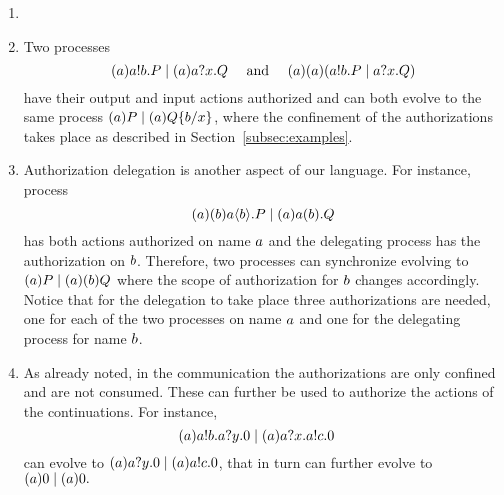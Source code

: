 \begin{example}
\label{ex:op_semantics1}
\begin{enumerate}\item[]{}
\item
Two processes
 \[
   {(a)a!b.P \;|\; (a)a?x.Q \quad  \text{ and } 
   \quad (a)(a)(a!b.P \;|\; a?x.Q)}
 \]
have their output and input actions authorized and can both evolve to  the same process $(a)P \;|\; (a)Q\{b/x\}$, where the confinement of the authorizations takes place as described in Section~\ref{subsec:examples}. 
\item
Authorization delegation is another aspect of our language. For instance, process
\[
   { (a)(b)a\langle b\rangle.P \;|\; (a)a(b).Q}
\] 
has both actions authorized on name $a$ and the delegating process has the %
authorization on $b$. Therefore, two processes can synchronize evolving to $(a)P \;|\; (a)(b)Q$ %
where the scope of authorization for $b$ changes accordingly.
Notice that for the delegation to take place three authorizations are needed, one for each of the two processes on name $a$ and one for the delegating process for name $b$.
\item
As already noted, in the communication the authorizations are only confined and are not consumed. These can further be used to authorize the actions of the continuations.
For instance, 
 \[
   (a)a!b.a?y.0 \;|\; (a)a?x.a!c.0 \quad
 \]
can evolve to  $(a)a?y.0 \;|\; (a)a!c.0$, that in turn can further evolve to  $(a) 0 \;|\; (a) 0.$
\end{enumerate}
\end{example}


